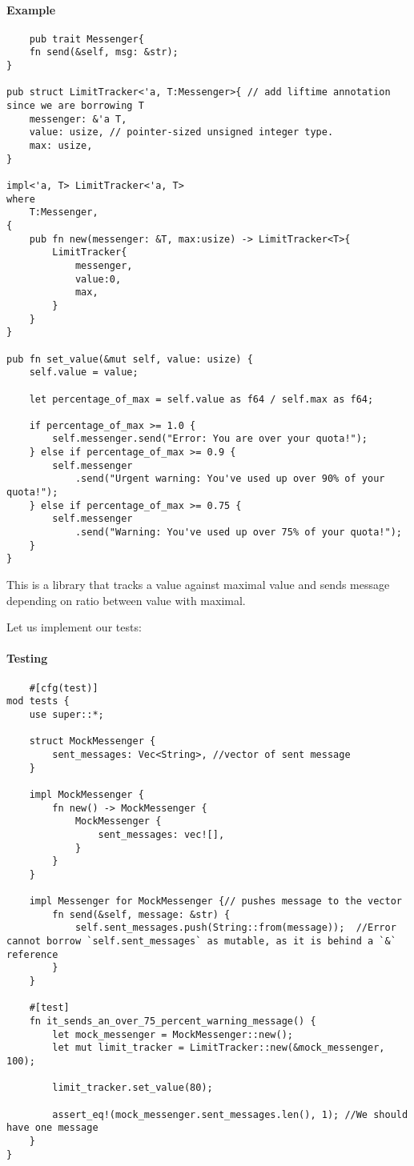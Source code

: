 \paragraph*{Example}\begin{lstlisting}
    pub trait Messenger{
    fn send(&self, msg: &str);
}

pub struct LimitTracker<'a, T:Messenger>{ // add liftime annotation since we are borrowing T
    messenger: &'a T,
    value: usize, // pointer-sized unsigned integer type.
    max: usize,
}

impl<'a, T> LimitTracker<'a, T>
where
    T:Messenger,
{
    pub fn new(messenger: &T, max:usize) -> LimitTracker<T>{
        LimitTracker{
            messenger,
            value:0,
            max,
        }
    }
}

pub fn set_value(&mut self, value: usize) {
    self.value = value;

    let percentage_of_max = self.value as f64 / self.max as f64;

    if percentage_of_max >= 1.0 {
        self.messenger.send("Error: You are over your quota!");
    } else if percentage_of_max >= 0.9 {
        self.messenger
            .send("Urgent warning: You've used up over 90% of your quota!");
    } else if percentage_of_max >= 0.75 {
        self.messenger
            .send("Warning: You've used up over 75% of your quota!");
    }
}
\end{lstlisting}
This is a library that tracks a value against maximal value and sends message depending on ratio between value with maximal.

Let us implement our tests:

\paragraph*{Testing}\begin{lstlisting}
    #[cfg(test)]
mod tests {
    use super::*;

    struct MockMessenger {
        sent_messages: Vec<String>, //vector of sent message
    }

    impl MockMessenger {
        fn new() -> MockMessenger {
            MockMessenger {
                sent_messages: vec![],
            }
        }
    }

    impl Messenger for MockMessenger {// pushes message to the vector
        fn send(&self, message: &str) {
            self.sent_messages.push(String::from(message));  //Error cannot borrow `self.sent_messages` as mutable, as it is behind a `&` reference 
        }
    }

    #[test]
    fn it_sends_an_over_75_percent_warning_message() {
        let mock_messenger = MockMessenger::new();
        let mut limit_tracker = LimitTracker::new(&mock_messenger, 100);

        limit_tracker.set_value(80);

        assert_eq!(mock_messenger.sent_messages.len(), 1); //We should have one message
    }
}
\end{lstlisting}

